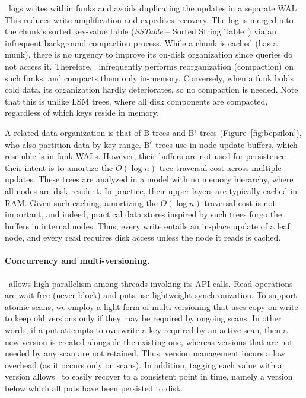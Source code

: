 \sys\ logs writes within funks and avoids duplicating the updates  in a separate WAL. This reduces write amplification and expedites recovery. 
The  log is merged into the chunk's sorted key-value table (\emph{SSTable} -- Sorted String Table~\cite{Bigtable2008}) 
via an infrequent background compaction process. 
While a chunk is cached (has a munk), there is no urgency to improve its on-disk organization since 
queries do not access it. Therefore, \sys\ infrequently performs reorganization (compaction) on such funks,
and compacts them only in-memory.
Conversely, when a funk holds cold data, its organization hardly deteriorates, so no compaction is needed.
Note that this is unlike LSM trees, where all disk components are compacted, regardless of which keys reside in memory.

A related data organization is that of  B-trees and B$^\epsilon$-trees (Figure~\ref{fig:bepsilon}), who also partition data by key range. 
B$^\epsilon$-trees use in-node update buffers, which resemble \sys's in-funk WALs.
However, their buffers are not used for persistence --- their intent is to amortize the $O(\log n)$ tree traversal cost across multiple updates. 
These trees are analyzed in a model with no memory hierarchy, where all nodes are disk-resident. In practice, their upper layers 
are typically cached in RAM. Given such caching, amortizing the $O(\log n)$ traversal cost is not important, and indeed, practical data stores inspired by
such trees forgo the buffers in internal nodes. Thus, every write entails an in-place update of a leaf node, and every read requires disk access unless the node it reads is cached.

 \paragraph{Concurrency and multi-versioning.}
 \sys\ allows high parallelism among threads invoking its API calls. 
 Read operations are wait-free (never block) and puts use lightweight synchronization. 
 To support atomic scans, we  employ a light form of multi-versioning that uses 
copy-on-write to keep old versions only if they may be required by ongoing scans. 
In other words, if a put attempts to overwrite a key required by an active scan, then a new version is created alongside the 
existing one, whereas versions that are not needed by any scan are not retained. 
Thus, version management incurs a low overhead (as it occurs only on scans). 
In addition, tagging each value with a version allows \sys\ to easily recover to a consistent point in time, namely a version below which all puts have been persisted to disk.

